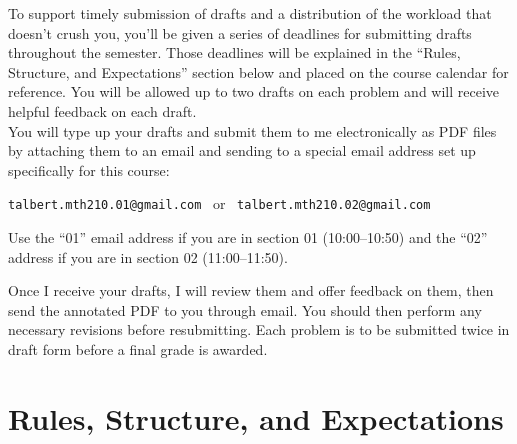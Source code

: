 \documentclass[11pt]{article}
\begin{document}
To support timely submission of drafts and a distribution of the workload that doesn't crush you, you'll be given a series of deadlines for submitting drafts throughout the semester. Those deadlines will be explained in the ``Rules, Structure, and Expectations'' section below and placed on the course calendar for reference. You will be allowed up to two drafts on each problem and will receive helpful feedback on each draft. 
\\

You will type up your drafts and submit them to me electronically as PDF files by attaching them to an email and sending to a special email address set up specifically for this course: 
\begin{center}
	\texttt{talbert.mth210.01@gmail.com} \ or \  \texttt{talbert.mth210.02@gmail.com} 
\end{center}
Use the ``01'' email address if you are in section 01 (10:00--10:50) and the ``02'' address if you are in section 02 (11:00--11:50).


Once I receive your drafts, I will review them and offer feedback on them, then send the annotated PDF to you through email. You should then perform any necessary revisions before resubmitting. Each problem is to be submitted twice in draft form before a final grade is awarded. 

\section{Rules, Structure, and Expectations}
\end{document}
